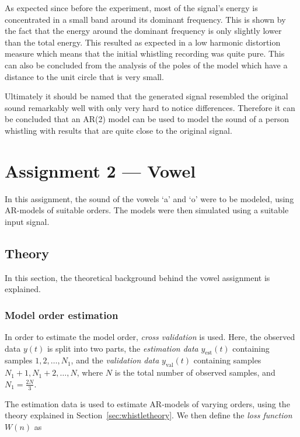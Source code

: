 \documentclass{IEEEtran}
\newcommand{\val}[1]{#1_{\text{val}}}
\newcommand{\est}[1]{#1_{\text{est}}}
\begin{document}
As expected since before the experiment, most of the signal's energy
is concentrated in a small band around its dominant frequency. This
is shown by the fact that the energy around the dominant frequency is
only slightly lower than the total energy. This resulted as expected
in a low harmonic distortion measure which means that the initial
whistling recording was quite pure. This can also be concluded from
the analysis of the poles of the model which have a distance to the
unit circle that is very small.

Ultimately it should be named that the generated signal resembled the
original sound remarkably well with only very hard to notice
differences. Therefore it can be concluded that an AR(2) model can
be used to model the sound of a person whistling with results that
are quite close to the original signal.

\section{Assignment 2 --- Vowel}

In this assignment, the sound of the vowels `a' and `o' were to be
modeled, using AR-models of suitable orders. The models were then
simulated using a suitable input signal.

\subsection{Theory}

In this section, the theoretical background behind the vowel assignment is
explained.

\subsubsection{Model order estimation}
\label{ssub:modelorderestimation}

In order to estimate the model order, \textit{cross validation} is used.
Here, the observed data $y(t)$ is split into two
parts, the \textit{estimation data} $\est{y}(t)$ containing samples $1,
2,\ldots,N_1$, and
the \textit{validation data} $\val{y}(t)$ containing samples $N_1 + 1, N_1 + 2,
\ldots,N$,
where $N$ is the total number of observed
samples, and $N_1 = \frac{2N}{3}$.

The estimation data is used to estimate AR-models of varying orders, using
the theory explained in Section~\ref{sec:whistletheory}. We then define the
\textit{loss function} $W(n)$ as
\end{document}
